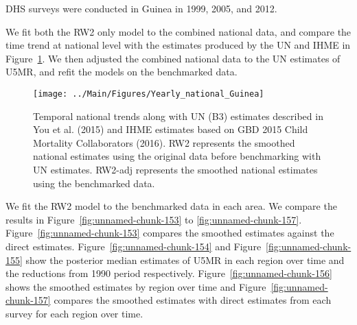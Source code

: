 \documentclass[12pt]{article}\usepackage[]{graphicx}\usepackage[]{color}
\newenvironment{knitrout}{}{} %
\begin{document}


DHS surveys were conducted in Guinea in 1999, 2005, and 2012.

We fit both the RW2 only model to the combined national data, and compare the time trend at national level with the estimates produced by the UN and IHME in Figure~\ref{fig:unnamed-chunk-152}. We then adjusted the combined national data to the UN estimates of U5MR, and refit the models on the benchmarked data. 

\begin{knitrout}
\color{fgcolor}\begin{figure}[bht]

{\centering \texttt{[image: ../Main/Figures/Yearly\_national\_Guinea]} 

}

\caption[Temporal national trends along with UN (B3) estimates described in You et al]{Temporal national trends along with UN (B3) estimates described in You et al. (2015) and IHME estimates based on GBD 2015 Child Mortality Collaborators (2016). RW2 represents the smoothed national estimates using the original data before benchmarking with UN estimates. RW2-adj represents the smoothed national estimates using the benchmarked data.}\label{fig:unnamed-chunk-152}
\end{figure}


\end{knitrout}
 

We fit the RW2 model to the benchmarked data in each area. 
We compare the results in Figure~\ref{fig:unnamed-chunk-153} to \ref{fig:unnamed-chunk-157}.
Figure~\ref{fig:unnamed-chunk-153} compares the smoothed estimates against the direct estimates. Figure~\ref{fig:unnamed-chunk-154} and Figure~\ref{fig:unnamed-chunk-155} show the posterior median estimates of U5MR in each region over time and the reductions from 1990 period respectively.
Figure~\ref{fig:unnamed-chunk-156} shows the smoothed estimates by region over time and Figure~\ref{fig:unnamed-chunk-157} compares the smoothed estimates with direct estimates from each survey for each region over time.


\end{document}
